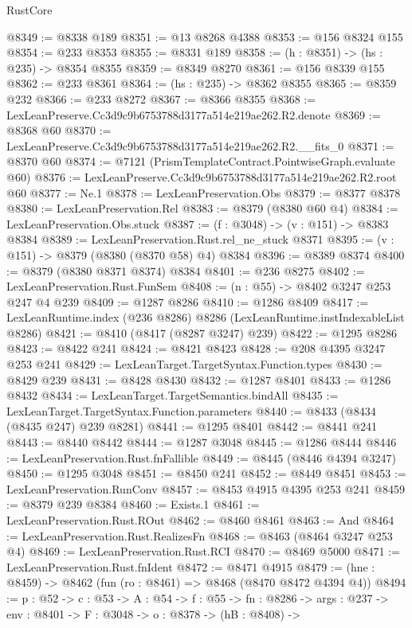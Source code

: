 \begin{lexlean}{RustCore}
\begin{coremodule}
@8349 := @8338 @189
@8351 := @13 @8268 @4388
@8353 := @156 @8324 @155
@8354 := @233 @8353
@8355 := @8331 @189
@8358 := (h : @8351) -> (hs : @235) -> @8354 @8355
@8359 := @8349 @8270
@8361 := @156 @8339 @155
@8362 := @233 @8361
@8364 := (hs : @235) -> @8362 @8355
@8365 := @8359 @232
@8366 := @233 @8272
@8367 := @8366 @8355
@8368 := LexLeanPreserve.Cc3d9c9b6753788d3177a514e219ae262.R2.denote
@8369 := @8368 @60
@8370 := LexLeanPreserve.Cc3d9c9b6753788d3177a514e219ae262.R2.__fits_0
@8371 := @8370 @60
@8374 := @7121 (PrismTemplateContract.PointwiseGraph.evaluate @60)
@8376 := LexLeanPreserve.Cc3d9c9b6753788d3177a514e219ae262.R2.root @60
@8377 := Ne.{1}
@8378 := LexLeanPreservation.Obs
@8379 := @8377 @8378
@8380 := LexLeanPreservation.Rel
@8383 := @8379 (@8380 @60 @4)
@8384 := LexLeanPreservation.Obs.stuck
@8387 := (f : @3048) -> (v : @151) -> @8383 @8384
@8389 := LexLeanPreservation.Rust.rel_ne_stuck @8371
@8395 := (v : @151) -> @8379 (@8380 (@8370 @58) @4) @8384
@8396 := @8389 @8374
@8400 := @8379 (@8380 @8371 @8374) @8384
@8401 := @236 @8275
@8402 := LexLeanPreservation.Rust.FunSem
@8408 := (n : @55) -> @8402 @3247 @253 @247 @4 @239
@8409 := @1287 @8286
@8410 := @1286 @8409
@8417 := LexLeanRuntime.index (@236 @8286) @8286 (LexLeanRuntime.instIndexableList @8286)
@8421 := @8410 (@8417 (@8287 @3247) @239)
@8422 := @1295 @8286
@8423 := @8422 @241
@8424 := @8421 @8423
@8428 := @208 @4395 @3247 @253 @241
@8429 := LexLeanTarget.TargetSyntax.Function.types
@8430 := @8429 @239
@8431 := @8428 @8430
@8432 := @1287 @8401
@8433 := @1286 @8432
@8434 := LexLeanTarget.TargetSemantics.bindAll
@8435 := LexLeanTarget.TargetSyntax.Function.parameters
@8440 := @8433 (@8434 (@8435 @247) @239 @8281)
@8441 := @1295 @8401
@8442 := @8441 @241
@8443 := @8440 @8442
@8444 := @1287 @3048
@8445 := @1286 @8444
@8446 := LexLeanPreservation.Rust.fnFallible
@8449 := @8445 (@8446 @4394 @3247)
@8450 := @1295 @3048
@8451 := @8450 @241
@8452 := @8449 @8451
@8453 := LexLeanPreservation.RunConv
@8457 := @8453 @4915 @4395 @253 @241
@8459 := @8379 @239 @8384
@8460 := Exists.{1}
@8461 := LexLeanPreservation.Rust.ROut
@8462 := @8460 @8461
@8463 := And
@8464 := LexLeanPreservation.Rust.RealizesFn
@8468 := @8463 (@8464 @3247 @253 @4)
@8469 := LexLeanPreservation.Rust.RCI
@8470 := @8469 @5000
@8471 := LexLeanPreservation.Rust.fnIdent
@8472 := @8471 @4915
@8479 := (hne : @8459) -> @8462 (fun (ro : @8461) => @8468 (@8470 @8472 @4394 @4))
@8494 := {p : @52} ->
  {c : @53} ->
  {A : @54} ->
  {f : @55} ->
  {fn : @8286} ->
  {args : @237} ->
  {env : @8401} ->
  {F : @3048} ->
  {o : @8378} ->
  (hB : @8408) ->

\end{coremodule}
\end{lexlean}
